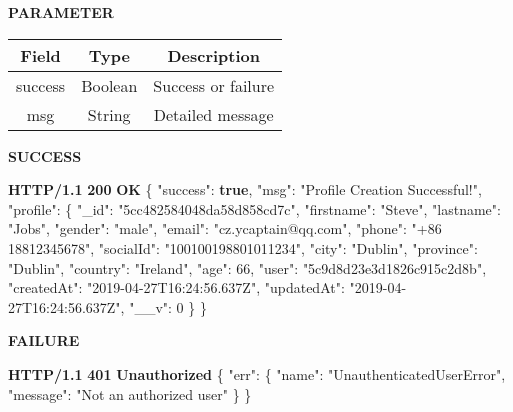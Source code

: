 \documentclass[
]{article}
\newenvironment{Shaded}{}{}
\newcommand{\DataTypeTok}[1]{\textcolor[rgb]{0.56,0.13,0.00}{#1}}
\newcommand{\DecValTok}[1]{\textcolor[rgb]{0.25,0.63,0.44}{#1}}
\newcommand{\ErrorTok}[1]{\textcolor[rgb]{1.00,0.00,0.00}{\textbf{#1}}}
\newcommand{\FunctionTok}[1]{\textcolor[rgb]{0.02,0.16,0.49}{#1}}
\newcommand{\KeywordTok}[1]{\textcolor[rgb]{0.00,0.44,0.13}{\textbf{#1}}}
\newcommand{\StringTok}[1]{\textcolor[rgb]{0.25,0.44,0.63}{#1}}
\begin{document}
\textbf{PARAMETER}

\begin{longtable}[]{@{}ccc@{}}
\toprule
Field & Type & Description\tabularnewline
\midrule
\endhead
success & Boolean & Success or failure\tabularnewline
msg & String & Detailed message\tabularnewline
\bottomrule
\end{longtable}

\textbf{SUCCESS}

\begin{Shaded}
\begin{Highlighting}[]
\ErrorTok{HTTP/1.1} \ErrorTok{200} \ErrorTok{OK}
\FunctionTok{\{}
    \DataTypeTok{"success"}\FunctionTok{:} \KeywordTok{true}\FunctionTok{,}
    \DataTypeTok{"msg"}\FunctionTok{:} \StringTok{"Profile Creation Successful!"}\FunctionTok{,}
    \DataTypeTok{"profile"}\FunctionTok{:} \FunctionTok{\{}
        \DataTypeTok{"_id"}\FunctionTok{:} \StringTok{"5cc482584048da58d858cd7c"}\FunctionTok{,}
        \DataTypeTok{"firstname"}\FunctionTok{:} \StringTok{"Steve"}\FunctionTok{,}
        \DataTypeTok{"lastname"}\FunctionTok{:} \StringTok{"Jobs"}\FunctionTok{,}
        \DataTypeTok{"gender"}\FunctionTok{:} \StringTok{"male"}\FunctionTok{,}
        \DataTypeTok{"email"}\FunctionTok{:} \StringTok{"cz.ycaptain@qq.com"}\FunctionTok{,}
        \DataTypeTok{"phone"}\FunctionTok{:} \StringTok{"+86 18812345678"}\FunctionTok{,}
        \DataTypeTok{"socialId"}\FunctionTok{:} \StringTok{"100100198801011234"}\FunctionTok{,}
        \DataTypeTok{"city"}\FunctionTok{:} \StringTok{"Dublin"}\FunctionTok{,}
        \DataTypeTok{"province"}\FunctionTok{:} \StringTok{"Dublin"}\FunctionTok{,}
        \DataTypeTok{"country"}\FunctionTok{:} \StringTok{"Ireland"}\FunctionTok{,}
        \DataTypeTok{"age"}\FunctionTok{:} \DecValTok{66}\FunctionTok{,}
        \DataTypeTok{"user"}\FunctionTok{:} \StringTok{"5c9d8d23e3d1826c915c2d8b"}\FunctionTok{,}
        \DataTypeTok{"createdAt"}\FunctionTok{:} \StringTok{"2019-04-27T16:24:56.637Z"}\FunctionTok{,}
        \DataTypeTok{"updatedAt"}\FunctionTok{:} \StringTok{"2019-04-27T16:24:56.637Z"}\FunctionTok{,}
        \DataTypeTok{"__v"}\FunctionTok{:} \DecValTok{0}
    \FunctionTok{\}}
\FunctionTok{\}}
\end{Highlighting}
\end{Shaded}

\textbf{FAILURE}

\begin{Shaded}
\begin{Highlighting}[]
\ErrorTok{HTTP/1.1} \ErrorTok{401} \ErrorTok{Unauthorized}
\FunctionTok{\{}
    \DataTypeTok{"err"}\FunctionTok{:} \FunctionTok{\{}
        \DataTypeTok{"name"}\FunctionTok{:} \StringTok{"UnauthenticatedUserError"}\FunctionTok{,}
        \DataTypeTok{"message"}\FunctionTok{:} \StringTok{"Not an authorized user"}
    \FunctionTok{\}}
\FunctionTok{\}}
\end{Highlighting}
\end{Shaded}
\end{document}
